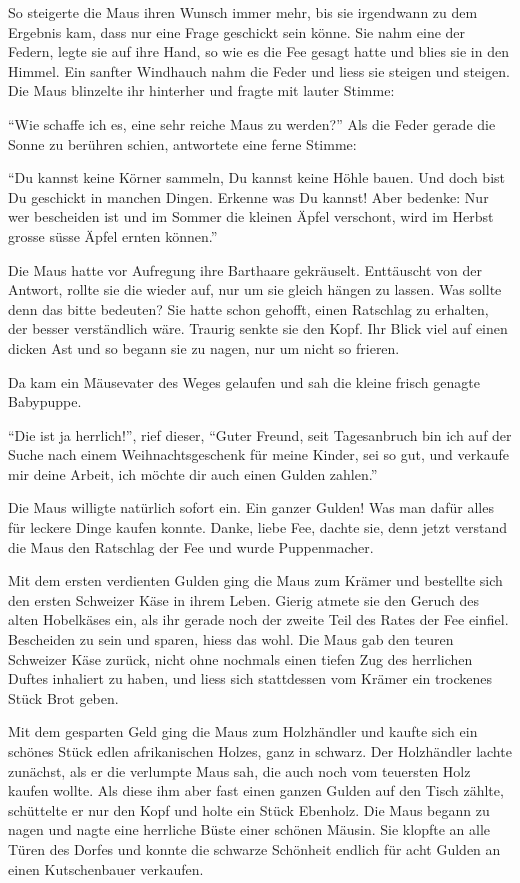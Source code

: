 So steigerte die Maus ihren Wunsch immer mehr, bis sie irgendwann zu dem Ergebnis kam, dass nur eine Frage geschickt sein könne. Sie nahm eine der Federn, legte sie auf ihre Hand, so wie es die Fee gesagt hatte und blies sie in den Himmel. Ein sanfter Windhauch nahm die Feder und liess sie steigen und steigen. Die Maus blinzelte ihr hinterher und fragte mit lauter Stimme: 

\enquote{Wie schaffe ich es, eine sehr reiche Maus zu werden?} Als die Feder gerade die Sonne zu berühren schien, antwortete eine ferne Stimme:

\enquote{Du kannst keine Körner sammeln, Du kannst keine Höhle bauen. Und doch bist Du geschickt in manchen Dingen. Erkenne was Du kannst! Aber bedenke: Nur wer bescheiden ist und im Sommer die kleinen Äpfel verschont, wird im Herbst grosse süsse Äpfel ernten können.} 

Die Maus hatte vor Aufregung ihre Barthaare gekräuselt. Enttäuscht von der Antwort, rollte sie die wieder auf, nur um sie gleich hängen zu lassen. Was sollte denn das bitte bedeuten? Sie hatte schon gehofft, einen Ratschlag zu erhalten, der besser verständlich wäre. Traurig senkte sie den Kopf. Ihr Blick viel auf einen dicken Ast und so begann sie zu nagen, nur um nicht so frieren. 

Da kam ein Mäusevater des Weges gelaufen und sah die kleine frisch genagte Babypuppe. 

\enquote{Die ist ja herrlich!}, rief dieser, \enquote{Guter Freund, seit Tagesanbruch bin ich auf der Suche nach einem Weihnachtsgeschenk für meine Kinder, sei so gut, und verkaufe mir deine Arbeit, ich möchte dir auch einen Gulden zahlen.}

Die Maus willigte natürlich sofort ein. Ein ganzer Gulden! Was man dafür alles für leckere Dinge kaufen konnte. Danke, liebe Fee, dachte sie, denn jetzt verstand die Maus den Ratschlag der Fee und wurde Puppenmacher. 

Mit dem ersten verdienten Gulden ging die Maus zum Krämer und bestellte sich den ersten Schweizer Käse in ihrem Leben. Gierig atmete sie den Geruch des alten Hobelkäses ein, als ihr gerade noch der zweite Teil des Rates der Fee einfiel. Bescheiden zu sein und sparen, hiess das wohl. Die Maus gab den teuren Schweizer Käse zurück, nicht ohne nochmals einen tiefen Zug des herrlichen Duftes inhaliert zu haben, und liess sich stattdessen vom Krämer ein trockenes Stück Brot geben. 

Mit dem gesparten Geld ging die Maus zum Holzhändler und kaufte sich ein schönes Stück edlen afrikanischen Holzes, ganz in schwarz. Der Holzhändler lachte zunächst, als er die verlumpte Maus sah, die auch noch vom teuersten Holz kaufen wollte. Als diese ihm aber fast einen ganzen Gulden auf den Tisch zählte, schüttelte er nur den Kopf und holte ein Stück Ebenholz. Die Maus begann zu nagen und nagte eine herrliche Büste einer schönen Mäusin. Sie klopfte an alle Türen des Dorfes und konnte die schwarze Schönheit endlich für acht Gulden an einen Kutschenbauer verkaufen.

